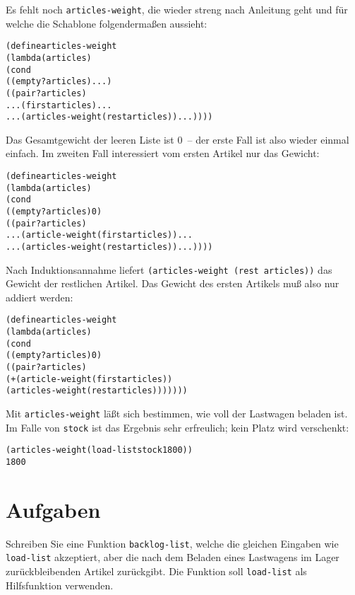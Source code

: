 %
Es fehlt noch \texttt{articles-weight}, die wieder streng nach Anleitung
geht und für welche die Schablone folgendermaßen aussieht:
%
\begin{alltt}
(define articles-weight
  (lambda (articles)
    (cond
     ((empty? articles) ...)
     ((pair? articles)
      ... (first articles) ...
      ... (articles-weight (rest articles)) ...))))
\end{alltt}
%
Das Gesamtgewicht der leeren Liste ist 0~-- der erste Fall ist also
wieder einmal einfach.  Im zweiten Fall interessiert vom ersten
Artikel nur das Gewicht:
%
\begin{alltt}
(define articles-weight
  (lambda (articles)
    (cond
     ((empty? articles) 0)
     ((pair? articles)
      ... (article-weight (first articles)) ...
      ... (articles-weight (rest articles)) ...))))
\end{alltt}
%
Nach Induktionsannahme liefert \texttt{(articles-weight (rest articles))} das
Gewicht der restlichen Artikel.  Das Gewicht des ersten Artikels muß also
nur addiert werden:
%
\begin{alltt}
(define articles-weight
  (lambda (articles)
    (cond
     ((empty? articles) 0)
     ((pair? articles)
      (+ (article-weight (first articles))
         (articles-weight (rest articles)))))))
\end{alltt}
%
Mit \texttt{articles-weight} läßt sich bestimmen, wie voll der
Lastwagen beladen ist.  Im Falle von \texttt{stock} ist das
Ergebnis sehr erfreulich; kein Platz wird verschenkt:
%
\begin{alltt}
(articles-weight (load-list stock 1800))
\evalsto{} 1800
\end{alltt}

\section*{Aufgaben}

\begin{aufgabe}
  Schreiben Sie eine Funktion \texttt{backlog-list}, welche die
  gleichen Eingaben wie \texttt{load-list} akzeptiert, aber die
  nach dem Beladen eines Lastwagens im Lager zurückbleibenden Artikel
  zurückgibt.  Die Funktion soll 
  \texttt{load-list} als Hilfsfunktion verwenden.
\end{aufgabe}

